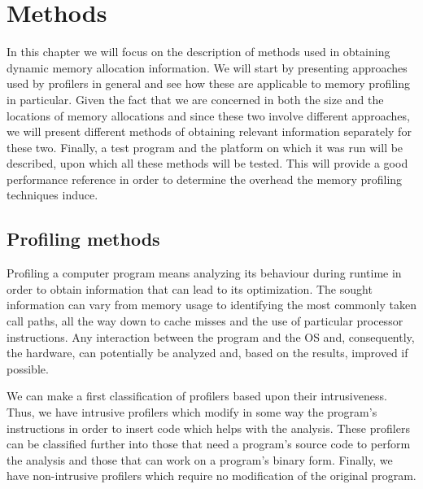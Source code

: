\chapter{Methods}
\label{chapter:methods}

In this chapter we will focus on the description of methods used in obtaining dynamic memory allocation information. We will start by presenting approaches used by profilers in general and see how these are applicable to memory profiling in particular. Given the fact that we are concerned in both the size and the locations of memory allocations and since these two involve different approaches, we will present different methods of obtaining relevant information separately for these two. Finally, a test program and the platform on which it was run will be described, upon which all these methods will be tested. This will provide a good performance reference in order to determine the overhead the memory profiling techniques induce.

\section{Profiling methods}
\label{section:profilingmethods}

Profiling a computer program means analyzing its behaviour during runtime in order to obtain information that can lead to its optimization. The sought information can vary from memory usage to identifying the most commonly taken call paths, all the way down to cache misses and the use of particular processor instructions. Any interaction between the program and the OS and, consequently, the hardware, can potentially be analyzed and, based on the results, improved if possible.

We can make a first classification of profilers based upon their intrusiveness. Thus, we have intrusive profilers which modify in some way the program's instructions in order to insert code which helps with the analysis. These profilers can be classified further into those that need a program's source code to perform the analysis and those that can work on a program's binary form. Finally, we have non-intrusive profilers which require no modification of the original program.

